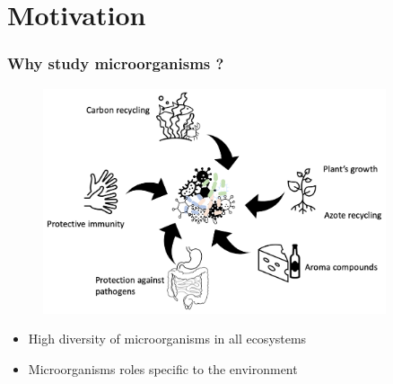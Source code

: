\documentclass[8pt,usenames,dvipsnames]{beamer}
\begin{document}
\section{Motivation}

\begin{frame}
\frametitle{Why study microorganisms ?}
\begin{figure}[t]
\centering   
\includegraphics[width=0.9\textwidth]{figures/bacterial-env.pdf}
\end{figure}
\begin{block}{}
\begin{itemize}
\item High diversity of microorganisms in all ecosystems
\item Microorganisms roles specific to the environment \tiny\citep{10.1093/chemse/bjh067,BELKAID2014121,Zhang2015,Hoorman2011,McSweeney2000}
\end{itemize}
\end{block}
\end{frame}
\end{document}
